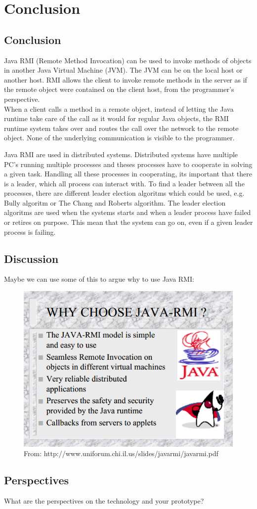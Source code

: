 \documentclass[Main]{subfiles}
\begin{document}
\chapter{Conclusion}

\section{Conclusion}
Java RMI (Remote Method Invocation) can be used to invoke methods of
objects in another Java Virtual Machine (JVM). The JVM can be on the
local host or another host. RMI allows the client to invoke remote methods in the server as if the remote object were contained on the client host, from the programmer's perspective.\\When a client calls a method in a remote object, instead of letting the Java runtime take care of the call as it would for regular Java objects, the RMI runtime system takes over and routes the call over the network to the remote object. None of the underlying communication is visible to the programmer.

Java RMI are used in distributed systems. Distributed systems have multiple PC's running multiple processes and theses processes have to cooperate in solving a given task. Handling all these processes in cooperating, its important that there is a leader, which all process can interact with. To find a leader between all the processes, there are different leader election algoritms which could be used, e.g. Bully algoritm or The Chang and Roberts algorithm. The leader election algoritms are used when the systems starts and when a leader process have failed or retires on purpose. This mean that the system can go on, even if a given leader process is failing.

\section{Discussion}

Maybe we can use some of this to argue why to use Java RMI:
\begin{figure}[H]
\centering
\includegraphics[scale=1]{Figurer/discussion.png}
\caption{From: http://www.uniforum.chi.il.us/slides/javarmi/javarmi.pdf}
\end{figure}


\section{Perspectives}
What are the perspectives on the technology and your prototype? 
\end{document}
